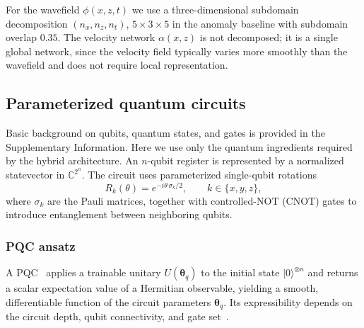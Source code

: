 \documentclass[11pt,a4paper]{article}
\begin{document}
For the wavefield $\phi(x,z,t)$ we use a three-dimensional subdomain decomposition $(n_x, n_z, n_t)$, $5\!\times\!3\!\times\!5$ in the anomaly baseline with subdomain overlap $0.35$. The velocity network $\alpha(x,z)$ is not decomposed; it is a single global network, since the velocity field typically varies more smoothly than the wavefield and does not require local representation.

\subsection{Parameterized quantum circuits}
\label{sec:methods_pqc}

Basic background on qubits, quantum states, and gates is provided in the Supplementary Information. Here we use only the quantum ingredients required by the hybrid architecture. An $n$-qubit register is represented by a normalized statevector in $\mathbb{C}^{2^n}$. The circuit uses parameterized single-qubit rotations
\begin{equation}
  R_k(\theta) = e^{-i\theta\,\sigma_k/2}, \qquad k \in \{x,y,z\},
\end{equation}
where $\sigma_k$ are the Pauli matrices, together with controlled-NOT (CNOT) gates to introduce entanglement between neighboring qubits.

\subsubsection{PQC ansatz}
\label{sec:circuit_architecture}

A PQC~\citep{Benedetti_2019} applies a trainable unitary $U(\boldsymbol{\theta}_q)$ to the initial state $|0\rangle^{\otimes n}$ and returns a scalar expectation value of a Hermitian observable, yielding a smooth, differentiable function of the circuit parameters $\boldsymbol{\theta}_q$. Its expressibility depends on the circuit depth, qubit connectivity, and gate set~\citep{sim2019expressibility}.
\end{document}
